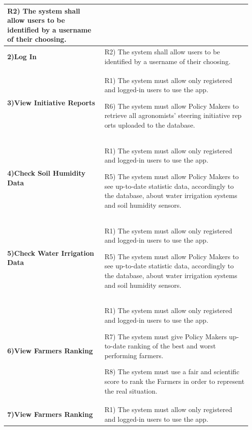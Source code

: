 \documentclass[table, 12pt]{article}
\begin{document}
\begin{itemize}
\begin{longtable}{|p{}|p{}|}
                                                                     R2) The system shall allow users to be identified by a username of their choosing.\\\hline
                    \cellcolor{SpringGreen!50}\textbf{2)Log In}\centering & R2) The system shall allow users to be identified by a username of their choosing. \\\hline
                    \cellcolor{SpringGreen!50}\textbf{3)View Initiative Reports}\centering &  R1) The system must allow only registered and logged-in users to use the app.

                                                                                              R6) The system must allow Policy Makers to retrieve all agronomists' steering initiative rep orts uploaded to the database.\\\hline
                    \cellcolor{SpringGreen!50}\textbf{4)Check Soil Humidity Data}\centering &  R1) The system must allow only registered and logged-in users to use the app.

                                                                                               R5) The system must allow Policy Makers to see up-to-date statistic data, accordingly to the database, about water irrigation systems and soil humidity sensors.\\\hline
                    \cellcolor{SpringGreen!50}\textbf{5)Check Water Irrigation Data}\centering &  R1) The system must allow only registered and logged-in users to use the app.

                                                                                                  R5) The system must allow Policy Makers to see up-to-date statistic data, accordingly to the database, about water irrigation systems and soil humidity sensors.\\\hline
                    
                    \cellcolor{SpringGreen!50}\textbf{6)View Farmers Ranking}\centering &  R1) The system must allow only registered and logged-in users to use the app.

                                                                                           R7) The system must give Policy Makers up-to-date ranking of the best and worst performing farmers.

                                                                                           R8) The system must use a fair and scientific score to rank the Farmers in order to represent the real situation.\\\hline
                    \cellcolor{SpringGreen!50}\textbf{7)View Farmers Ranking}\centering &  R1) The system must allow only registered and logged-in users to use the app.


\end{longtable}
\end{itemize}
\end{document}
